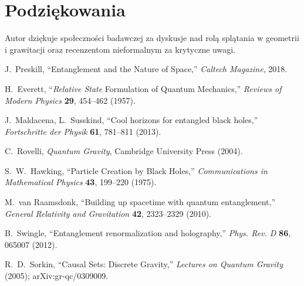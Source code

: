 \documentclass[11pt,a4paper]{article}
\begin{document}
\section*{Podzi\k{e}kowania}
Autor dziękuje społeczności badawczej za dyskusje nad rolą splątania w geometrii i grawitacji oraz recenzentom nieformalnym za krytyczne uwagi.

\begin{thebibliography}{99}

J.~Preskill, ``Entanglement and the Nature of Space,'' \emph{Caltech Magazine}, 2018.

H.~Everett, ``\textit{Relative State} Formulation of Quantum Mechanics,'' \emph{Reviews of Modern Physics} \textbf{29}, 454--462 (1957).

J.~Maldacena, L.~Susskind, ``Cool horizons for entangled black holes,'' \emph{Fortschritte der Physik} \textbf{61}, 781--811 (2013).

C.~Rovelli, \emph{Quantum Gravity}, Cambridge University Press (2004).

S.~W.~Hawking, ``Particle Creation by Black Holes,'' \emph{Communications in Mathematical Physics} \textbf{43}, 199--220 (1975).

M.~van Raamsdonk, ``Building up spacetime with quantum entanglement,'' \emph{General Relativity and Gravitation} \textbf{42}, 2323--2329 (2010).

B.~Swingle, ``Entanglement renormalization and holography,'' \emph{Phys. Rev. D} \textbf{86}, 065007 (2012).

R.~D.~Sorkin, ``Causal Sets: Discrete Gravity,'' \emph{Lectures on Quantum Gravity} (2005); arXiv:gr-qc/0309009.

\end{thebibliography}
\end{document}
